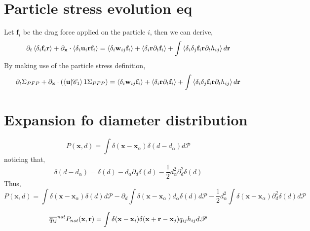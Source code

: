 \section*{Particle stress evolution eq}
Let $\textbf{f}_i$ be the drag force applied on the particle $i$, then we can derive,
\begin{equation*}
    \partial_t \left<\delta_i \textbf{f}_i\textbf{r}\right> 
  + \partial_\textbf{x} \cdot \left<\delta_i\textbf{u}_i \textbf{r} \textbf{f}_i\right>
  = \left<\delta_i\textbf{w}_{ij} \textbf{f}_i\right>
  + \left<\delta_i\textbf{r}\partial_t  \textbf{f}_i\right> 
  + \int\left<\delta_i\delta_{j} \textbf{f}_i\textbf{r}\partial_t h_{ij} \right>d\textbf{r}
\end{equation*}
By making use of the particle stress definition, 
\begin{equation*}
    \partial_t \Sigma_{PFP}
  + \partial_\textbf{x} \cdot \left(
    \left<\textbf{u} | \mathscr{C}_1\right>{1} \Sigma_{PFP}
  \right)
  = \left<\delta_i\textbf{w}_{ij} \textbf{f}_i\right>
  + \left<\delta_i\textbf{r}\partial_t  \textbf{f}_i\right> 
  + \int \left<\delta_i\delta_{j} \textbf{f}_i\textbf{r}\partial_t h_{ij}\right>d\textbf{r}
\end{equation*}


\section*{Expansion fo diameter distribution}

\begin{equation}
    P(\textbf{x},d) 
    = \int \delta(\textbf{x} - \textbf{x}_\alpha)
    \delta(d - d_\alpha) d \mathscr{P}
\end{equation}
noticing that, 
\begin{equation}
    \delta(d - d_\alpha)
    = \delta(d) 
    -d_\alpha \partial_d \delta(d) 
    -\frac{1}{2}d^2_\alpha \partial^2_d \delta(d) 
\end{equation}
Thus, 
\begin{equation}
    P(\textbf{x},d) 
    = 
    \int \delta(\textbf{x} - \textbf{x}_\alpha)
    \delta(d) 
    d \mathscr{P}
    -  \partial_d \int \delta(\textbf{x} - \textbf{x}_\alpha)
    d_\alpha \delta(d) 
    d \mathscr{P}
    -\frac{1}{2}d^2_\alpha \int \delta(\textbf{x} - \textbf{x}_\alpha)
     \partial^2_d \delta(d)
     d \mathscr{P}
\end{equation}







\begin{equation*}
    \overline{q_{ij}}^{nst} P_{nst}(\textbf{x},\textbf{r})
    = \int\delta(\textbf{x} - \textbf{x}_i) \delta(\textbf{x}+\textbf{r}-\textbf{x}_j) q_{ij} h_{ij} d\mathscr{P} 
\end{equation*}


